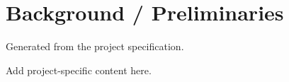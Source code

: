 \section{Background / Preliminaries}
Generated from the project specification.

Add project-specific content here.
